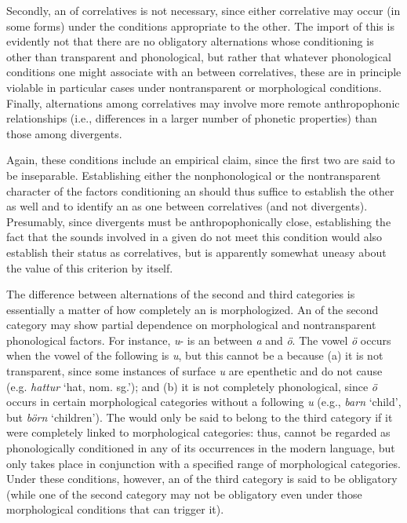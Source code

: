 Secondly, an  of correlatives is not necessary, since
either correlative may occur (in some forms) under the conditions
appropriate to the other. The import of this is evidently not that
there are no obligatory alternations whose conditioning is other than
transparent and phonological, but rather that whatever phonological
conditions one might associate with an  between
correlatives, these are in principle violable in particular cases
under nontransparent or morphological conditions. Finally,
alternations among correlatives may involve more remote anthropophonic
relationships (i.e., differences in a larger number of phonetic
properties) than those among divergents.

Again, these conditions include an empirical claim, since the first
two are said to be inseparable. Establishing either the
nonphonological or the nontransparent character of the factors
conditioning an  should thus suffice to establish the other
as well and to identify an  as one between correlatives
(and not divergents). Presumably, since divergents must be
anthropophonically close, establishing the fact that the sounds
involved in a given  do not meet this condition would also
establish their status as correlatives, but {\Kruszewski} is apparently
somewhat uneasy about the value of this criterion by itself.

The difference between alternations of the second and third categories
is essentially a matter of how completely an  is
morphologized. An  of the second category may show partial
dependence on morphological and nontransparent phonological
factors. For instance,  \emph{u}- is an 
between \emph{a} and \emph{ö}. The vowel \emph{ö} occurs when the
vowel of the following  is \emph{u}, but this 
cannot be a  because (a) it is not transparent, since some
instances of surface \emph{u} are epenthetic and do not cause 
(e.g. \emph{hattur} `hat, nom. sg.'); and (b) it is not completely
phonological, since \emph{ö} occurs in certain morphological
categories without a following \emph{u} (e.g., \emph{barn} `child',
but \emph{börn} `children'). The  would only be said to
belong to the third category if it were completely linked to
morphological categories: thus,   cannot be regarded as
phonologically conditioned in any of its occurrences in the modern
language, but only takes place in conjunction with a specified range
of morphological categories. Under these conditions, however, an
 of the third category is said to be obligatory (while one
of the second category may not be obligatory even under those
morphological conditions that can trigger it).

